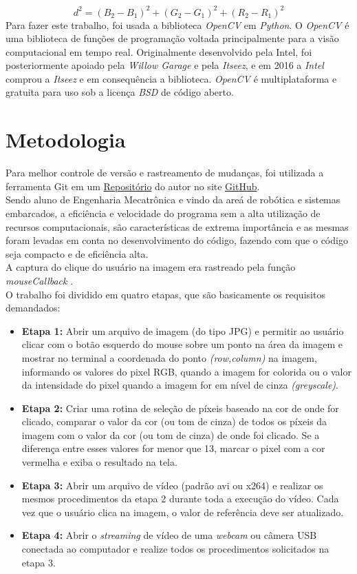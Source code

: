 \documentclass{bmvc2k}
\begin{document}
    \vspace{-3mm}
    \begin{equation}\label{eq:rgbeuc}
        d^2 = (B_2 - B_1)^2 + (G_2 - G_1)^2 + (R_2 - R_1)^2
    \end{equation}
    Para fazer este trabalho, foi usada a biblioteca \textit{OpenCV} em \textit{Python}. O \textit{OpenCV} é uma biblioteca de funções de programação voltada principalmente para a visão computacional em tempo real. Originalmente desenvolvido pela Intel, foi posteriormente apoiado pela \textit{Willow Garage} e pela \textit{Itseez}, e em 2016 a \textit{Intel} comprou a \textit{Itseez} e em consequência a biblioteca. \textit{OpenCV} é multiplataforma e gratuita para uso sob a licença \textit{BSD} de código aberto.
\section{Metodologia}
    Para melhor controle de versão e rastreamento de mudanças, foi utilizada a ferramenta Git em um  \href{https://github.com/abdullah-zaiter/Similar-Pixels-Detector}{Repositório} do autor no site \href{https://github.com}{GitHub}.\\
    Sendo aluno de Engenharia Mecatrônica e vindo da areá de robótica e sistemas embarcados, a eficiência e velocidade  do programa sem a alta utilização de recursos computacionais, são características de extrema importância e as mesmas foram levadas em conta no desenvolvimento do código, fazendo com que o código seja compacto e de eficiência alta. \\
    A captura do clique do usuário na imagem era rastreado pela função \textit{mouseCallback} \cite{MouseCallback}.\\
    O trabalho foi dividido em quatro etapas, que são basicamente os requisitos demandados:
    \begin{itemize}
        \item \textbf{Etapa 1:} Abrir um arquivo de imagem \cite{imgread} (do tipo JPG) e permitir ao usuário clicar com o botão esquerdo do mouse sobre um ponto na área da imagem e mostrar no terminal a coordenada do ponto \textit{(row,column)} na imagem, informando os valores do pixel RGB, quando a imagem for colorida ou o valor da intensidade do pixel quando a imagem for em nível de cinza \textit{(greyscale)}.
        \item \textbf{Etapa 2:} Criar uma rotina de seleção de píxeis baseado na cor de onde for clicado, comparar o valor da cor (ou tom de cinza) de todos os píxeis da imagem com o valor da cor (ou tom de cinza) de onde foi clicado. 
        Se a diferença entre esses valores for menor que 13, marcar o pixel com a cor vermelha e exiba o resultado na tela.
        \item \textbf{Etapa 3:} Abrir um arquivo de vídeo (padrão avi ou x264) e realizar os mesmos procedimentos da etapa 2 durante toda a execução do vídeo. Cada vez que o usuário clica na imagem, o valor de referência deve ser atualizado.
        \item \textbf{Etapa 4:} Abrir o \textit{streaming} de vídeo de uma \textit{webcam} ou câmera USB conectada ao computador e realize todos os procedimentos solicitados na etapa 3.
    \end{itemize}
\end{document}
